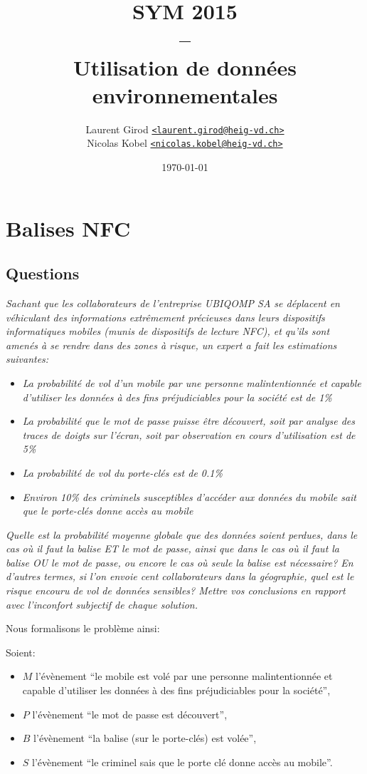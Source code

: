 \documentclass[a4paper,11pt,titlepage]{article}
\title{SYM 2015\\--\\Utilisation de données environnementales}
\author{%
Laurent Girod \href{mailto:laurent.girod@heig-vd.ch}{\texttt{<laurent.girod@heig-vd.ch>}}\\%
Nicolas Kobel \href{mailto:nicolas.kobel@heig-vd.ch}{\texttt{<nicolas.kobel@heig-vd.ch>}}%
}
\date{\today}
\begin{document}
\maketitle{}
\section{Balises NFC}
\subsection*{Questions}
\textit{Sachant que les collaborateurs de l'entreprise UBIQOMP SA se déplacent en véhiculant des
informations extrêmement précieuses dans leurs dispositifs informatiques mobiles (munis de dispositifs de
lecture NFC), et qu'ils sont amenés à se rendre dans des zones à risque, un expert a fait les estimations
suivantes:}
\begin{itemize}
	\item \textit{La probabilité de vol d'un mobile par une personne malintentionnée et capable d'utiliser les
		données à des fins préjudiciables pour la société est de 1\%}
	\item \textit{La probabilité que le mot de passe puisse être découvert, soit par analyse des traces de doigts sur
		l'écran, soit par observation en cours d'utilisation est de 5\%}
	\item \textit{La probabilité de vol du porte-clés est de 0.1\%}
	\item \textit{Environ 10\% des criminels susceptibles d'accéder aux données du mobile sait que le porte-clés
		donne accès au mobile}
\end{itemize}

\textit{Quelle est la probabilité moyenne globale que des données soient perdues, dans le cas où il faut la
balise ET le mot de passe, ainsi que dans le cas où il faut la balise OU le mot de passe, ou encore le cas où
seule la balise est nécessaire? En d'autres termes, si l'on envoie cent collaborateurs dans la géographie,
quel est le risque encouru de vol de données sensibles? Mettre vos conclusions en rapport avec l'inconfort
subjectif de chaque solution.}

Nous formalisons le problème ainsi:

Soient:
\begin{itemize}
	\item $M$ l'évènement ``le mobile est volé par une personne malintentionnée et capable d'utiliser les données
		à des fins préjudiciables pour la société'',
	\item $P$ l'évènement ``le mot de passe est découvert'',
	\item $B$ l'évènement ``la balise (sur le porte-clés) est volée'',
	\item $S$ l'évènement ``le criminel sais que le porte clé donne accès au mobile''.
\end{itemize}
\end{document}
